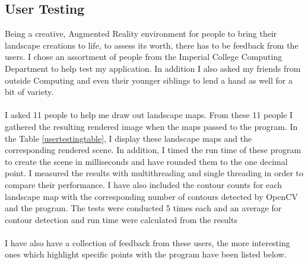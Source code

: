 \documentclass[11pt]{article}
\begin{document}
\subsection{User Testing}
\label{sec:usertesting}
Being a creative, Augmented Reality environment for people to bring their 
landscape creations to life, to assess its worth, there has to be feedback
from the users. I chose an assortment of people from the Imperial College
Computing Department to help test my application. In addition I also asked
my friends from outside Computing and even their younger siblings
to lend a hand as well for a bit of variety. \\
\\
I asked 11 people to help me draw out landscape maps. From these 11 people
I gathered the resulting rendered image when the maps passed to the
program. In the Table \ref{usertestingtable}, I display these
landscape maps and the corresponding rendered scene. In addition, I timed
the run time of these program to create the scene in milliseconds and have
rounded them to the one decimal point. I measured the results with
multithreading and single threading in order to compare their performance.
I have also included the contour counts for each landscape map with
the corresponding number of contours detected by OpenCV and the program.
The tests were conducted 5 times each and an average for contour
detection and run time were calculated from the results\\
\\
I have also have a collection of feedback from these users, the more
interesting ones which highlight specific points with the program have 
been listed below.
\end{document}
